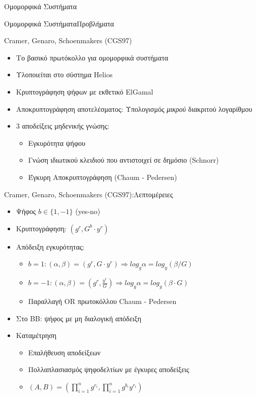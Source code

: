 \documentclass[handout]{beamer}
\begin{document}
\begin{section}{Ομομορφικά Συστήματα}
\begin{frame}{Ομομορφικά Συστήματα}{Προβλήματα}
\end{frame}

\begin{frame}{Cramer, Genaro, Schoenmakers (CGS97)}
    \begin{itemize}
        \item Το βασικό πρωτόκολλο για ομομορφικά συστήματα \pause 
        \item Υλοποιείται στο σύστημα Helios \pause 
        \item Κρυπτογράφηση ψήφων με εκθετικό ElGamal \pause 
        \item Αποκρυπτογράφηση αποτελέσματος: Υπολογισμός \pause  \emph{μικρού} διακριτού λογαρίθμου  \pause 
        \item 3 αποδείξεις μηδενικής γνώσης:
        \begin{itemize}
            \item Εγκυρότητα ψήφου
            \item Γνώση ιδιωτικού κλειδιού που αντιστοιχεί σε δημόσιο (Schnorr)
            \item Έγκυρη Αποκρυπτογράφηση (Chaum - Pedersen)
        \end{itemize}
    \end{itemize}
\end{frame}

\begin{frame}{Cramer, Genaro, Schoenmakers (CGS97):Λεπτομέρειες}
    \begin{itemize}
        \item Ψήφος $b \in \{1,-1\}$ (yes-no) \pause 
        \item Κρυπτογράφηση: $(g^r, G^b \cdot y^r)$ \pause 
        \item Απόδειξη εγκυρότητας:
        \begin{itemize}
            \item $b=1: (\alpha,\beta) = (g^r, G \cdot y^r) \Rightarrow log_g \alpha = log_y (\beta / G)$
            \item $b=-1: (\alpha,\beta) = (g^r, \frac{y^r}{G} ) \Rightarrow log_g \alpha = log_y (\beta \cdot G)$
            \item Παραλλαγή OR πρωτοκόλλου Chaum - Pedersen 
        \end{itemize}
        \item Στο BB: ψήφος με μη διαλογική απόδειξη \pause 
        \item Καταμέτρηση \pause 
        \begin{itemize}
            \item Επαλήθευση αποδείξεων \pause 
            \item Πολλαπλασιασμός ψηφοδελτίων με έγκυρες αποδείξεις
            \item $(A,B) = (\prod_{i=1}^n g^{r_i}, \prod_{i=1}^n g^{b_i}y^{r_i}) $ \pause 
            

\end{itemize}
\end{itemize}
\end{frame}
\end{section}
\end{document}
